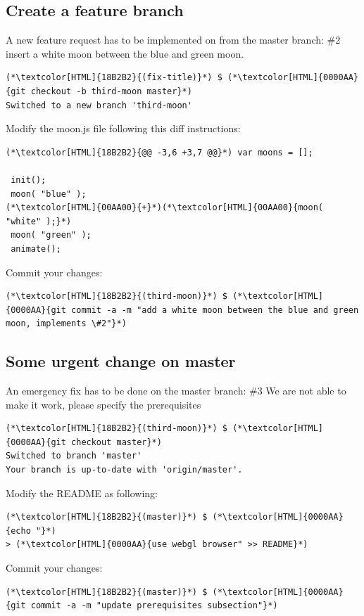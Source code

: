 \subsection{Create a feature branch}
\begin{frame}[fragile]
  \subslidetitle

  A new feature request has to be implemented on from the master branch:
  \newline \vspace{1em}
  \#2 insert a white moon between the blue and green moon.
  \begin{lstlisting}
(*\textcolor[HTML]{18B2B2}{(fix-title)}*) $ (*\textcolor[HTML]{0000AA}{git checkout -b third-moon master}*)
Switched to a new branch 'third-moon'
\end{lstlisting}
  Modify the moon.js file following this diff instructions:
  \begin{lstlisting}
(*\textcolor[HTML]{18B2B2}{@@ -3,6 +3,7 @@}*) var moons = [];

 init();
 moon( "blue" );
(*\textcolor[HTML]{00AA00}{+}*)(*\textcolor[HTML]{00AA00}{moon( "white" );}*)
 moon( "green" );
 animate();
\end{lstlisting}
  Commit your changes:
  \begin{lstlisting}
(*\textcolor[HTML]{18B2B2}{(third-moon)}*) $ (*\textcolor[HTML]{0000AA}{git commit -a -m "add a white moon between the blue and green moon, implements \#2"}*)
\end{lstlisting}

\end{frame}


\subsection{Some urgent change on master}
\begin{frame}[fragile]
  \subslidetitle

  An emergency fix has to be done on the master branch:
  \newline \vspace{1em}
  \#3 We are not able to make it work, please specify the prerequisites
  \begin{lstlisting}
(*\textcolor[HTML]{18B2B2}{(third-moon)}*) $ (*\textcolor[HTML]{0000AA}{git checkout master}*)
Switched to branch 'master'
Your branch is up-to-date with 'origin/master'.
\end{lstlisting}

  Modify the README as following:
  \begin{lstlisting}
(*\textcolor[HTML]{18B2B2}{(master)}*) $ (*\textcolor[HTML]{0000AA}{echo "}*)
> (*\textcolor[HTML]{0000AA}{use webgl browser" >> README}*)
\end{lstlisting}

  Commit your changes:
  \begin{lstlisting}
(*\textcolor[HTML]{18B2B2}{(master)}*) $ (*\textcolor[HTML]{0000AA}{git commit -a -m "update prerequisites subsection"}*)
\end{lstlisting}

\end{frame}
